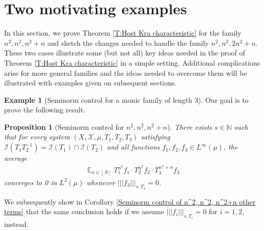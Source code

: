 \documentclass[11pt]{amsart}
\newtheorem{proposition}[lemma]{Proposition}
\theoremstyle{definition}
\newtheorem{example}{Example}
\newcommand{\N}{{\mathbb N}}
\newcommand{\CI}{{\mathcal I}}
\newcommand{\CX}{{\mathcal X}}
\newcommand{\nnorm}[1]{\lvert\!|\!| #1|\!|\!\rvert}
\DeclareMathOperator*{\E}{\mathbb{E}}
\begin{document}
\section{Two motivating examples}\label{S:n^2, n^2, n^2+n}
 In this section, we prove  Theorem \ref{T:Host Kra characteristic} for the family $n^2, n^2, n^2+n$ and sketch the changes needed to handle the family   $n^2, n^2, 2n^2+n$. These two  cases illustrate some (but not all) key ideas needed in the proof of  Theorem \ref{T:Host Kra characteristic} in a simple setting.   Additional complications arise for more general families and the ideas needed to overcome them will be illustrated with  examples given on subsequent sections.


\begin{example}[Seminorm control for a monic family of length 3]\label{Ex: n^2, n^2, n^2+n}
Our goal is to prove the following result.
\begin{proposition}[Seminorm control for $n^2,n^2,n^2+n$]\label{Seminorm control of n^2, n^2, n^2+n}
    There exists $s\in\N$ such that  for every system $(X, \CX, \mu, T_1, T_2, T_3)$ satisfying $\CI(T_1 T_2^{-1})=\CI(T_1)\cap\CI(T_2)$ and all   functions $f_1, f_2, f_3\in L^\infty(\mu)$, the average
    \begin{align}\label{E:n^2, n^2, n^2+n}
    \E_{n\in[N]}T_1^{n^2} f_1 \cdot T_2^{n^2}f_2 \cdot T_3^{n^2+n}f_3
\end{align}
    converges to 0 in $L^2(\mu)$ whenever $\nnorm{f_3}_{s, T_3} = 0$.
\end{proposition}
We subsequently show in Corollary	\ref{Seminorm control of n^2, n^2, n^2+n other terms} that the same conclusion holds if we assume $\nnorm{f_i}_{s, T_i} = 0$ for $i=1,2,$ instead.


\end{example}
\end{document}
